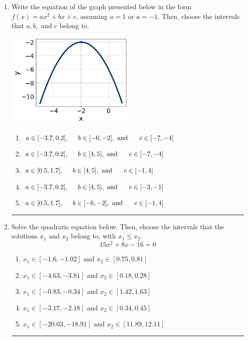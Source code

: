 \documentclass[14pt]{extbook}
\newcommand{\litem}[1]{\item#1\hspace*{-1cm}\rule{\textwidth}{0.4pt}}
\begin{document}
\begin{enumerate}
{\begin{enumerate}[label=\Alph*.]
\end{enumerate} }
\litem{
Write the equation of the graph presented below in the form $f(x)=ax^2+bx+c$, assuming  $a=1$ or $a=-1$. Then, choose the intervals that $a, b,$ and $c$ belong to.
\begin{center}
    \includegraphics[width=0.5\textwidth]{../Figures/quadraticGraphToEquationA.png}
\end{center}
\begin{enumerate}[label=\Alph*.]
\item \( a \in [-3.7, 0.2], \hspace*{5mm} b \in [-6, -2], \text{ and } \hspace*{5mm} c \in [-7, -4] \)
\item \( a \in [-3.7, 0.2], \hspace*{5mm} b \in [4, 5], \text{ and } \hspace*{5mm} c \in [-7, -4] \)
\item \( a \in [0.5, 1.7], \hspace*{5mm} b \in [4, 5], \text{ and } \hspace*{5mm} c \in [-1, 4] \)
\item \( a \in [-3.7, 0.2], \hspace*{5mm} b \in [4, 5], \text{ and } \hspace*{5mm} c \in [-3, -1] \)
\item \( a \in [0.5, 1.7], \hspace*{5mm} b \in [-6, -2], \text{ and } \hspace*{5mm} c \in [-1, 4] \)

\end{enumerate} }
\litem{
Solve the quadratic equation below. Then, choose the intervals that the solutions $x_1$ and $x_2$ belong to, with $x_1 \leq x_2$.\[ 15x^{2} +8 x -16 = 0 \]\begin{enumerate}[label=\Alph*.]
\item \( x_1 \in [-1.6, -1.02] \text{ and } x_2 \in [0.75, 0.81] \)
\item \( x_1 \in [-4.63, -3.81] \text{ and } x_2 \in [0.18, 0.28] \)
\item \( x_1 \in [-0.83, -0.34] \text{ and } x_2 \in [1.42, 1.63] \)
\item \( x_1 \in [-3.17, -2.18] \text{ and } x_2 \in [0.34, 0.45] \)
\item \( x_1 \in [-20.03, -18.91] \text{ and } x_2 \in [11.89, 12.11] \)


\end{enumerate}}
\end{enumerate}
\end{document}

